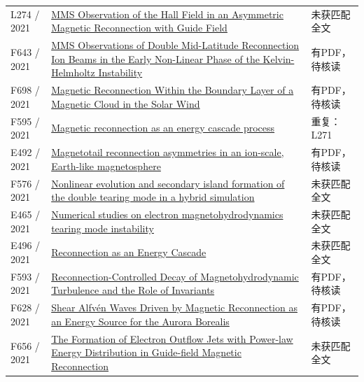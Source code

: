 \documentclass[UTF8,a4paper,11pt,openany,fontset=fandol]{ctexbook}
\begin{document}
\begin{longtable}{P{24mm}P{97mm}P{27mm}}
L274 / 2021 & \href{https://doi.org/10.3847/1538-4357/ac31b1}{MMS Observation of the Hall Field in an Asymmetric Magnetic Reconnection with Guide Field} & 未获匹配全文\\

F643 / 2021 & \href{https://doi.org/10.3389/fspas.2021.760885}{MMS Observations of Double Mid-Latitude Reconnection Ion Beams in the Early Non-Linear Phase of the Kelvin-Helmholtz Instability} & 有PDF，待核读\\

F698 / 2021 & \href{https://doi.org/10.1029/2021ja029415}{Magnetic Reconnection Within the Boundary Layer of a Magnetic Cloud in the Solar Wind} & 有PDF，待核读\\

F595 / 2021 & \href{https://doi.org/10.48550/arxiv.2104.12013}{Magnetic reconnection as an energy cascade process} & 重复：L271\\

E492 / 2021 & \href{https://doi.org/10.5194/angeo-39-991-2021}{Magnetotail reconnection asymmetries in an ion-scale,  Earth-like magnetosphere} & 有PDF，待核读\\

F576 / 2021 & \href{https://doi.org/10.1088/2058-6272/abe038}{Nonlinear evolution and secondary island formation of the double tearing mode in a hybrid simulation} & 未获匹配全文\\

E465 / 2021 & \href{https://doi.org/10.1063/5.0066269}{Numerical studies on electron magnetohydrodynamics tearing mode instability} & 未获匹配全文\\

E496 / 2021 & \href{https://doi.org/10.1002/essoar.10508377.1}{Reconnection as an Energy Cascade} & 未获匹配全文\\

F593 / 2021 & \href{https://doi.org/10.1103/physrevx.11.041005}{Reconnection-Controlled Decay of Magnetohydrodynamic Turbulence and the Role of Invariants} & 有PDF，待核读\\

F628 / 2021 & \href{https://doi.org/10.1029/2021gl094201}{Shear Alfvén Waves Driven by Magnetic Reconnection as an Energy Source for the Aurora Borealis} & 有PDF，待核读\\

F656 / 2021 & \href{https://doi.org/10.3847/1538-4357/abcf29}{The Formation of Electron Outflow Jets with Power-law Energy Distribution in Guide-field Magnetic Reconnection} & 未获匹配全文\\


\end{longtable}
\end{document}
